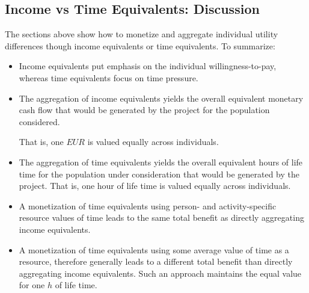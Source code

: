 \subsection{Income vs Time Equivalents: Discussion}
\label{ch:economicEval:aggregatingValues:discussion:incVsTime}
The sections above show how to monetize and aggregate individual utility differences though income equivalents or time equivalents. To summarize:
%
\begin{itemize}\styleItemize
%
\item Income equivalents put emphasis on the individual willingness-to-pay, whereas time equivalents focus on time pressure.
%
\item The aggregation of income equivalents yields the overall
equivalent monetary cash flow that would be generated by the project for
the population considered.

%
That is, one $\mathit{EUR}$ is valued equally across individuals.
%
\item The aggregation of time equivalents yields the overall 
equivalent hours of life time for 
the population under consideration
that would be generated by the project.
%
%
That is, one hour of life time is valued equally across individuals.
%
\item A monetization of time equivalents using person- and activity-specific resource values of time leads to the same total benefit as directly aggregating income equivalents. 
%
\item A monetization of time equivalents using some average value of time as a resource, therefore generally leads to a different total benefit than directly aggregating income equivalents.  Such an approach maintains the equal value for one $h$ of life time.
%
\end{itemize}

